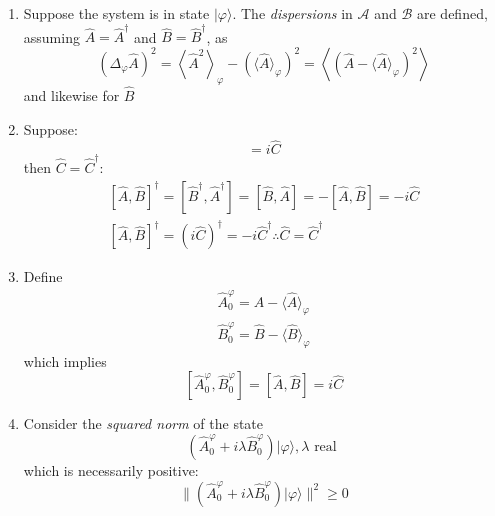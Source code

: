 \documentclass[12pt]{article}
\begin{document}
\begin{enumerate}
\item Suppose the system is in state $|\varphi\rangle$. The
\emph{dispersions} in $\mathcal{A}$ and $\mathcal{B}$ are defined,
assuming 
$\hat{A}=\hat{A}^{\dagger}$ and $\hat{B}=\hat{B}^{\dagger}$,
as
\begin{equation}
\left(\Delta_{\varphi} \hat{A}\right)^{2}=\left\langle\hat{A}^{2}\right\rangle_{\varphi}-\left(\langle\hat{A}\rangle_{\varphi}\right)^{2}=\left\langle\left(\hat{A}-\langle\hat{A}\rangle_{\varphi}\right)^{2}\right\rangle
\end{equation}
and likewise for $\hat{B}$
%
\item Suppose:
\begin{equation}
[\hat{A}, \hat{B}]=i \hat{C}
\end{equation}
then $\hat{C} = \hat{C}^{\dagger}$:
\begin{equation}
\begin{gathered}
[\hat{A}, \hat{B}]^{\dagger}=\left[\hat{B}^{\dagger},\hat{A}^{\dagger}\right]=[\hat{B}, \hat{A}]=-[\hat{A}, \hat{B}] = - i\hat{C}\\ 
[\hat{A}, \hat{B}]^{\dagger} = (i \hat{C})^{\dagger} = -i \hat{C}^{\dagger} 
\therefore \hat{C}=\hat{C}^{\dagger} 
\end{gathered}
\end{equation}
%
\item Define
\begin{equation}
\begin{array}{l}\hat{A}_{0}^{\varphi}=\hat{A}-\langle\hat{A}\rangle_{\varphi} \\ \hat{B}_{0}^{\varphi}=\hat{B}-\langle\hat{B}\rangle_{\varphi}\end{array}
\end{equation}
which implies
\begin{equation}
\left[\hat{A}_{0}^{\varphi}, \hat{B}_{0}^{\varphi}\right]=[\hat{A}, \hat{B}]=i \hat{C}
\end{equation}
%
\item Consider the \emph{squared norm} of the state
\begin{equation}
\left(\hat{A}_{0}^{\varphi}+i \lambda \hat{B}_{0}^{\varphi}\right)|\varphi\rangle, \lambda \textrm { real }
\end{equation}
which is necessarily positive:
\begin{equation}
\|\left(\hat{A}_{0}^{\varphi}+i \lambda \hat{B}_{0}^{\varphi}\right)|\varphi\rangle \|^{2} \geqslant 0
\label{eq:g23}
\end{equation}

\end{enumerate}
\end{document}
